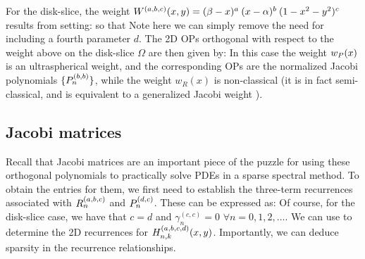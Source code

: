 For the disk-slice, the weight ${W^{(a,b,c)}}(x,y) = (\beta - x)^a \: (x - \alpha)^b \: (1-x^2-y^2)^c$ results from setting:
so that
Note here we can simply remove the need for including a fourth parameter $d$. The 2D OPs orthogonal with respect to the weight above on the disk-slice $\Omega$ are then given by:
In this case the weight $w_P(x)$ is an ultraspherical weight, and the corresponding OPs are the normalized Jacobi polynomials $\{{P}_n^{(b, b)}\}$, while the weight $w_R(x)$ is non-classical (it is in fact semi-classical, and is equivalent to a generalized Jacobi weight \cite[\S5]{magnus1995painleve}).



\subsection{Jacobi matrices}

Recall that Jacobi matrices are an important piece of the puzzle for using these orthogonal polynomials to practically solve PDEs in a sparse spectral method. To obtain the entries for them, we first need to establish the three-term recurrences associated with $R_n^{(a,b,c)}$ and ${P}_n^{(d,c)}$. These can be expressed as: 
Of course, for the disk-slice case, we have that $c = d$ and $\gamma_{n}^{(c,c)} = 0$ $\forall n=0,1,2,\dots$. We can use  to determine the 2D recurrences for $H_{n,k}^{(a,b,c,d)}(x,y)$. Importantly, we can deduce sparsity in the recurrence relationships.

